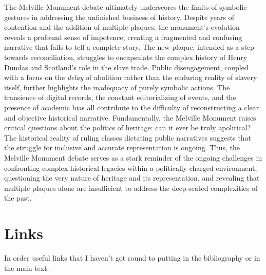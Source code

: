 \documentclass{scrartcl}
\begin{document}
The Melville Monument debate ultimately underscores the limits of symbolic gestures in addressing the unfinished business of history. Despite years of contention and the addition of multiple plaques, the monument's evolution reveals a profound sense of impotence, creating a fragmented and confusing narrative that fails to tell a complete story. The new plaque, intended as a step towards reconciliation, struggles to encapsulate the complex history of Henry Dundas and Scotland's role in the slave trade. Public disengagement, coupled with a focus on the \textit{delay} of abolition rather than the enduring reality of slavery itself, further highlights the inadequacy of purely symbolic actions. The transience of digital records, the constant editorializing of events, and the presence of academic bias all contribute to the difficulty of reconstructing a clear and objective historical narrative. Fundamentally, the Melville Monument raises critical questions about the politics of heritage: can it ever be truly apolitical? The historical reality of ruling classes dictating public narratives suggests that the struggle for inclusive and accurate representation is ongoing. Thus, the Melville Monument debate serves as a stark reminder of the ongoing challenges in confronting complex historical legacies within a politically charged environment, questioning the very nature of heritage and its representation, and revealing that multiple plaques alone are insufficient to address the deep-seated complexities of the past.

\section{Links}

In order useful links that I haven't got round to putting in the bibliography or in the main text.
\end{document}
